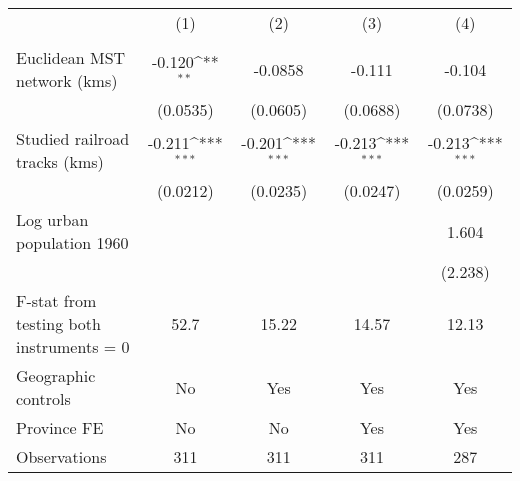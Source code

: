 {
\def\sym#1{\ifmmode^{#1}\else\(^{#1}\)\fi}
\begin{tabular}{l*{4}{c}}
\hline\hline
                &\multicolumn{1}{c}{(1)}&\multicolumn{1}{c}{(2)}&\multicolumn{1}{c}{(3)}&\multicolumn{1}{c}{(4)}\\
                &\multicolumn{1}{c}{}&\multicolumn{1}{c}{}&\multicolumn{1}{c}{}&\multicolumn{1}{c}{}\\
\hline
Euclidean MST network (kms)&   -0.120\sym{**} &  -0.0858         &   -0.111         &   -0.104         \\
                & (0.0535)         & (0.0605)         & (0.0688)         & (0.0738)         \\
[1em]
Studied railroad tracks (kms)&   -0.211\sym{***}&   -0.201\sym{***}&   -0.213\sym{***}&   -0.213\sym{***}\\
                & (0.0212)         & (0.0235)         & (0.0247)         & (0.0259)         \\
[1em]
Log urban population 1960&                  &                  &                  &    1.604         \\
                &                  &                  &                  &  (2.238)         \\
\hline
F-stat from testing both instruments = 0&     52.7         &    15.22         &    14.57         &    12.13         \\
Geographic controls&       No         &      Yes         &      Yes         &      Yes         \\
Province FE     &       No         &       No         &      Yes         &      Yes         \\
Observations    &      311         &      311         &      311         &      287         \\
\hline\hline
\end{tabular}
}
